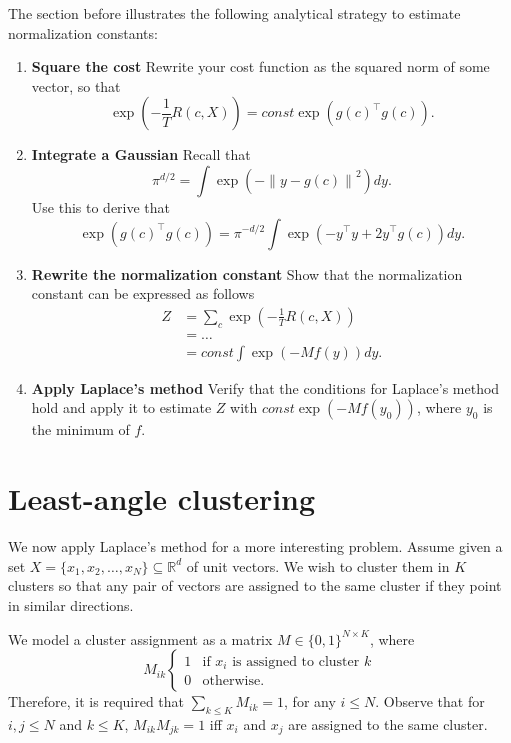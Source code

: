 The section before illustrates the following analytical strategy to estimate normalization constants:

\begin{enumerate}
\item \textbf{Square the cost} Rewrite your cost function as the squared norm of some vector, so that
%
\begin{equation}
\exp\left(-\frac{1}{T}R(c, X)\right) = \mathit{const}\exp\left(g(c)^\top g(c)\right).
\end{equation}
%
\item \textbf{Integrate a Gaussian} Recall that
%
\begin{equation}
\pi^{d/2} = \int \exp\left(-\left\|y - g(c)\right\|^2\right) dy.
\end{equation}
%
Use this to derive that
%
\begin{equation}
\exp\left(g(c)^\top g(c)\right) = \pi^{-d/2}\int \exp\left(-y^\top y + 2y^\top g(c)\right)dy.
\end{equation}
%
\item \textbf{Rewrite the normalization constant} Show that the normalization constant can be expressed as follows
%
\begin{align}
Z &= \sum_{c} \exp\left(-\frac{1}{T}R(c, X)\right)\\ 
&= \ldots\\
&= \mathit{const} \int \exp\left(-M f(y)\right)dy.
\end{align}
%

\item \textbf{Apply Laplace's method} Verify that the conditions for Laplace's method hold and apply it to estimate $Z$ with $\mathit{const}\exp\left(-M f(y_0)\right)$, where $y_0$ is the minimum of $f$.
\end{enumerate}

\section{Least-angle clustering}

We now apply Laplace's method for a more interesting problem.
Assume given a set $X = \{x_1, x_2, \ldots, x_N\} \subseteq \mathbb{R}^d$ of unit vectors. We wish to cluster them in $K$ clusters so that any pair of vectors are assigned to the same cluster if they point in similar directions.

We model a cluster assignment as a matrix $M \in \{0, 1\}^{N \times K}$, where
%
\begin{equation}
M_{ik} \begin{cases}
1 & \text{if $x_i$ is assigned to cluster $k$}\\
0 & \text{otherwise}.
\end{cases}
\end{equation}
%
Therefore, it is required that $\sum_{k \leq K} M_{ik} = 1$, for any $i \leq N$. Observe that for $i, j \leq N$ and $k \leq K$, $M_{ik}M_{jk} = 1$ iff $x_i$ and $x_j$ are assigned to the same cluster.

